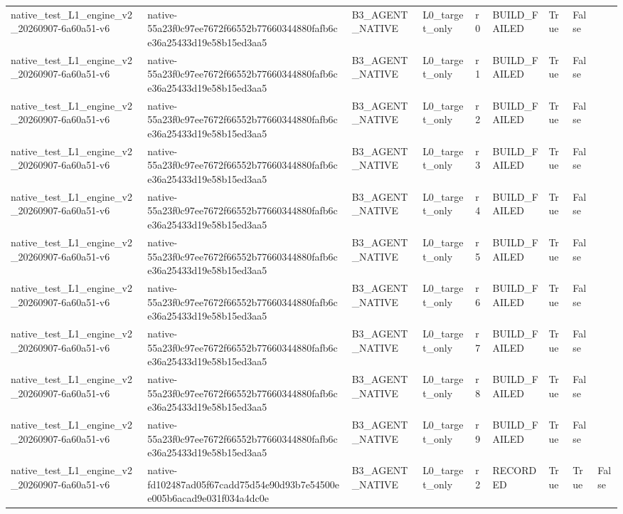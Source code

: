 \begin{tabular}{lllllllll}
native\_test\_L1\_engine\_v2\_20260907-6a60a51-v6 & native-55a23f0c97ee7672f66552b77660344880fafb6ce36a25433d19e58b15ed3aa5 & B3\_AGENT\_NATIVE & L0\_target\_only & r0 & BUILD\_FAILED & True & False &  \\
native\_test\_L1\_engine\_v2\_20260907-6a60a51-v6 & native-55a23f0c97ee7672f66552b77660344880fafb6ce36a25433d19e58b15ed3aa5 & B3\_AGENT\_NATIVE & L0\_target\_only & r1 & BUILD\_FAILED & True & False &  \\
native\_test\_L1\_engine\_v2\_20260907-6a60a51-v6 & native-55a23f0c97ee7672f66552b77660344880fafb6ce36a25433d19e58b15ed3aa5 & B3\_AGENT\_NATIVE & L0\_target\_only & r2 & BUILD\_FAILED & True & False &  \\
native\_test\_L1\_engine\_v2\_20260907-6a60a51-v6 & native-55a23f0c97ee7672f66552b77660344880fafb6ce36a25433d19e58b15ed3aa5 & B3\_AGENT\_NATIVE & L0\_target\_only & r3 & BUILD\_FAILED & True & False &  \\
native\_test\_L1\_engine\_v2\_20260907-6a60a51-v6 & native-55a23f0c97ee7672f66552b77660344880fafb6ce36a25433d19e58b15ed3aa5 & B3\_AGENT\_NATIVE & L0\_target\_only & r4 & BUILD\_FAILED & True & False &  \\
native\_test\_L1\_engine\_v2\_20260907-6a60a51-v6 & native-55a23f0c97ee7672f66552b77660344880fafb6ce36a25433d19e58b15ed3aa5 & B3\_AGENT\_NATIVE & L0\_target\_only & r5 & BUILD\_FAILED & True & False &  \\
native\_test\_L1\_engine\_v2\_20260907-6a60a51-v6 & native-55a23f0c97ee7672f66552b77660344880fafb6ce36a25433d19e58b15ed3aa5 & B3\_AGENT\_NATIVE & L0\_target\_only & r6 & BUILD\_FAILED & True & False &  \\
native\_test\_L1\_engine\_v2\_20260907-6a60a51-v6 & native-55a23f0c97ee7672f66552b77660344880fafb6ce36a25433d19e58b15ed3aa5 & B3\_AGENT\_NATIVE & L0\_target\_only & r7 & BUILD\_FAILED & True & False &  \\
native\_test\_L1\_engine\_v2\_20260907-6a60a51-v6 & native-55a23f0c97ee7672f66552b77660344880fafb6ce36a25433d19e58b15ed3aa5 & B3\_AGENT\_NATIVE & L0\_target\_only & r8 & BUILD\_FAILED & True & False &  \\
native\_test\_L1\_engine\_v2\_20260907-6a60a51-v6 & native-55a23f0c97ee7672f66552b77660344880fafb6ce36a25433d19e58b15ed3aa5 & B3\_AGENT\_NATIVE & L0\_target\_only & r9 & BUILD\_FAILED & True & False &  \\
native\_test\_L1\_engine\_v2\_20260907-6a60a51-v6 & native-fd102487ad05f67cadd75d54e90d93b7e54500ee005b6acad9e031f034a4dc0e & B3\_AGENT\_NATIVE & L0\_target\_only & r2 & RECORDED & True & True & False \\

\end{tabular}
